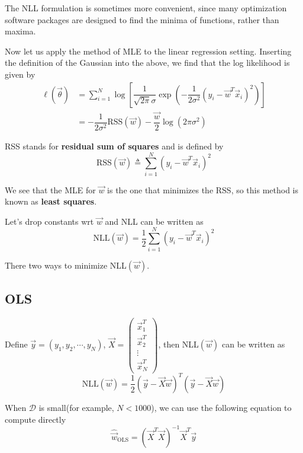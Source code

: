 The NLL formulation is sometimes more convenient, since many optimization software packages are designed to find the minima of functions, rather than maxima.

Now let us apply the method of MLE to the linear regression setting. Inserting the definition of the Gaussian into the above, we find that the log likelihood is given by
\begin{align}
\ell(\vec{\theta})& =\sum\limits_{i=1}^N \log\left[\dfrac{1}{\sqrt{2\pi}\sigma}\exp\left(-\dfrac{1}{2\sigma^2}(y_i-\vec{w}^T\vec{x}_i)^2\right)\right] \\
     & =-\dfrac{1}{2\sigma^2}\text{RSS}(\vec{w})-\dfrac{\vec{w}}{2}\log(2\pi\sigma^2)
\end{align}

RSS stands for \textbf{residual sum of squares} and is defined by
\begin{equation}
\text{RSS}(\vec{w}) \triangleq \sum\limits_{i=1}^N (y_i-\vec{w}^T\vec{x}_i)^2
\end{equation}

We see that the MLE for $\vec{w}$ is the one that minimizes the RSS, so this method is known as \textbf{least squares}.

Let's drop constants wrt $\vec{w}$ and NLL can be written as
\begin{equation}
\text{NLL}(\vec{w}) = \dfrac{1}{2}\sum\limits_{i=1}^N (y_i-\vec{w}^T\vec{x}_i)^2
\end{equation}

There two ways to minimize NLL$(\vec{w})$.


\subsection{OLS}
Define $\vec{y}=(y_1,y_2,\cdots,y_N)$, $\vec{X}=\left(\begin{array}{c}\vec{x}_1^T \\ \vec{x}_2^T \\ \vdots \\ \vec{x}_N^T\end{array}\right)$, then NLL$(\vec{w})$ can be written as
\begin{equation}
\text{NLL}(\vec{w})=\dfrac{1}{2}(\vec{y}-\vec{X}\vec{w})^T(\vec{y}-\vec{X}\vec{w})
\end{equation}

When $\mathcal{D}$ is small(for example, $N < 1000$), we can use the following equation to compute  directly
\begin{equation}
\hat{\vec{w}}_{\mathrm{OLS}}=(\vec{X}^T\vec{X})^{-1}\vec{X}^T\vec{y}
\end{equation}

